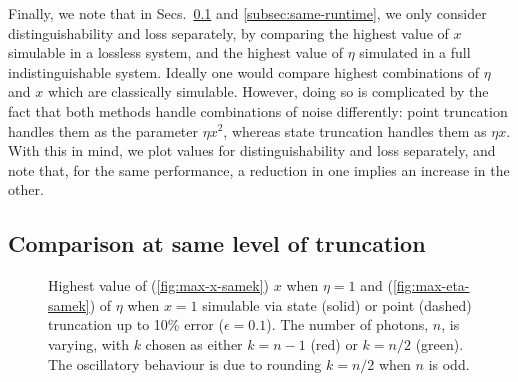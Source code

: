 Finally, we note that in Secs.\ \ref{subsec:same-k} and \ref{subsec:same-runtime}, we only consider distinguishability and loss separately, by comparing the highest value of $x$ simulable in a lossless system, and the highest value of $\eta$ simulated in a full indistinguishable system. 
Ideally one would compare highest combinations of $\eta$ and $x$ which are classically simulable. 
However, doing so is complicated by the fact that both methods handle combinations of noise differently: point truncation handles them as the parameter $\eta x^2$, whereas state truncation handles them as $\eta x$. 
With this in mind, we plot values for distinguishability and loss separately, and note that, for the same performance, a reduction in one implies an increase in the other.


\subsection{Comparison at same level of truncation}
\label{subsec:same-k}

\begin{figure}
\hfill
{}
\caption[Highest value of $x$ and $\eta$ simulable via state or point truncation]{\label{fig:samek} 
Highest value of (\ref{fig:max-x-samek}) $x$ when $\eta=1$ and (\ref{fig:max-eta-samek}) of $\eta$ when $x=1$ simulable via state (solid) or point (dashed) truncation up to 10\% error ($\epsilon=0.1$). 
The number of photons, $n$, is varying, with $k$ chosen as either $k=n-1$ (red) or $k=n/2$ (green).
The oscillatory behaviour is due to rounding $k=n/2$ when $n$ is odd.}
\end{figure}

